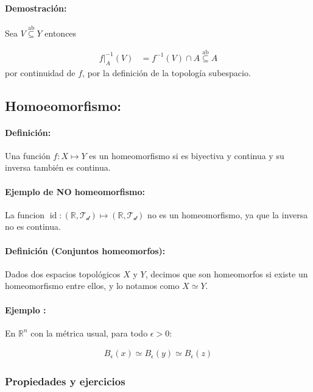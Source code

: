 \paragraph{Demostración:} Sea $V \overset{\text{ab}}{\subseteq} Y$ entonces 

\begin{align*}
    f|_{A}^{-1}(V) &= f^{-1}(V) \cap A \overset{\text{ab}}{\subseteq} A
\end{align*} 
por continuidad de $f$, por la definición de la topología subespacio.

\subsection{Homoeomorfismo:}

\paragraph{Definición:} Una función $f:X \mapsto Y$ es un homeomorfismo si es biyectiva y continua y su inversa también es continua.

\paragraph{Ejemplo de NO homeomorfismo:}  La funcion $\operatorname{id}:(\mathbb R,\mathcal{T_d}) \mapsto (\mathbb R,\mathcal{T_d})$ no es un homeomorfismo, ya que la inversa no es continua.

\paragraph{Definición (Conjuntos homeomorfos):} Dados dos espacios topológicos $X$ y $Y$, decimos que son homeomorfos si existe un homeomorfismo entre ellos, y lo notamos como $X \simeq Y$.

\paragraph{Ejemplo :} En $\mathbb R^n$ con la métrica usual, para todo $\epsilon > 0$:

\begin{align*}
    B_\epsilon(x)  \simeq B_\epsilon(y) \simeq B_\epsilon(z)
\end{align*}

\subsubsection{Propiedades y ejercicios}

